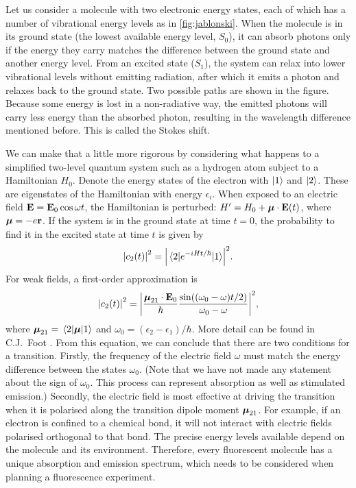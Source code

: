 Let us consider a molecule with two electronic energy states, each of which has a number of vibrational energy levels as in \autoref{fig:jablonski}. When the molecule is in its ground state (the lowest available energy level, $ S_0 $), it can absorb photons only if the energy they carry matches the difference between the ground state and another energy level. From an excited state ($ S_1 $), the system can relax into lower vibrational levels without emitting radiation, after which it emits a photon and relaxes back to the ground state. Two possible paths are shown in the figure. Because some energy is lost in a non-radiative way, the emitted photons will carry less energy than the absorbed photon, resulting in the wavelength difference mentioned before. This is called the Stokes shift. 

We can make that a little more rigorous by considering what happens to a simplified two-level quantum system such as a hydrogen atom subject to a Hamiltonian $ H_0 $. Denote the energy states of the electron with $ \ket{1} $ and $ \ket{2} $. These are eigenstates of the Hamiltonian with energy $ \epsilon_i $. When exposed to an electric field $ \vb{E} = \vb{E}_0 \cos\omega t$, the Hamiltonian is perturbed: $ H' = H_0 + \vb*{\mu} \cdot \vb{E}(t) $, where $ \vb*{\mu} = -e\vb{r}$. If the system is in the ground state at time $ t=0 $, the probability to find it in the excited state at time $ t $ is given by
\begin{equation}
	\abs{c_2(t)}^2 = \abs{\mel{2}{e^{-iHt/\hbar}}{1}}^2.
\end{equation}
For weak fields, a first-order approximation is
\begin{equation}
	\abs{c_2(t)}^2 = \abs{ \frac{\vb*{\mu}_{21}\cdot\vb{E}_0}{\hbar}  \frac{\sin((\omega_0-\omega)t/2)}{\omega_0-\omega}}^2,
	\label{eq:transition moment}
\end{equation}
where $ \vb*{\mu}_{21} = \mel{2}{\vb*{\mu}}{1} $ and $ \omega_0 = (\epsilon_2-\epsilon_1)/\hbar $. More detail can be found in C.J.~Foot \cite{Foot}. From this equation, we can conclude that there are two conditions for a transition. Firstly, the frequency of the electric field $ \omega $ must match the energy difference between the states $ \omega_0 $. (Note that we have not made any statement about the sign of $ \omega_0 $. This process can represent absorption as well as stimulated emission.) Secondly, the electric field is most effective at driving the transition when it is polarised along the transition dipole moment $ \vb*{\mu}_{21} $. For example, if an electron is confined to a chemical bond, it will not interact with electric fields polarised orthogonal to that bond. The precise energy levels available depend on the molecule and its environment. Therefore, every fluorescent molecule has a unique absorption and emission spectrum, which needs to be considered when planning a fluorescence experiment.

